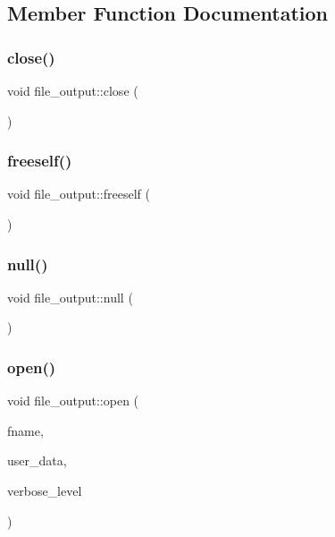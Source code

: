 \subsection{Member Function Documentation}
\mbox{\label{classfile__output_a9b85121967f7cd6537707f57140a6f4e}} 
\subsubsection{\texorpdfstring{close()}{close()}}
{\footnotesize\ttfamily void file\+\_\+output\+::close (\begin{DoxyParamCaption}{ }\end{DoxyParamCaption})}

\mbox{\label{classfile__output_aaedcbfbac16ba9327db4d77bb5f0c180}} 
\subsubsection{\texorpdfstring{freeself()}{freeself()}}
{\footnotesize\ttfamily void file\+\_\+output\+::freeself (\begin{DoxyParamCaption}{ }\end{DoxyParamCaption})}

\mbox{\label{classfile__output_a533ca0160e5dea028b4022c04ca150f9}} 
\subsubsection{\texorpdfstring{null()}{null()}}
{\footnotesize\ttfamily void file\+\_\+output\+::null (\begin{DoxyParamCaption}{ }\end{DoxyParamCaption})}

\mbox{\label{classfile__output_a97b70b3bf28bc029b27d3c4f61a5e6ed}} 
\subsubsection{\texorpdfstring{open()}{open()}}
{\footnotesize\ttfamily void file\+\_\+output\+::open (\begin{DoxyParamCaption}\item[{const \mbox{\hyperlink{galois_8h_ab6cc7b4aeb6ea31aba2b3fbfc83ff5e6}{B\+Y\+TE}} $\ast$}]{fname,  }\item[{void $\ast$}]{user\+\_\+data,  }\item[{\mbox{\hyperlink{galois_8h_a09fddde158a3a20bd2dcadb609de11dc}{I\+NT}}}]{verbose\+\_\+level }\end{DoxyParamCaption})}

